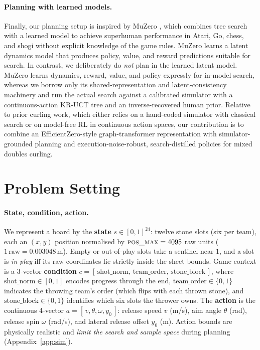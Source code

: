 \documentclass[11pt]{article}
\begin{document}
\paragraph{Planning with learned models.}
Finally, our planning setup is inspired by MuZero
\cite{schrittwieser2020mastering}, which combines tree search with a learned
model to achieve superhuman performance in Atari, Go, chess, and shogi
without explicit knowledge of the game rules. MuZero learns a latent
dynamics model that produces policy, value, and reward predictions suitable
for search. In contrast, we deliberately do \emph{not} plan in the learned
latent model. MuZero learns dynamics, reward, value, and policy expressly
for in-model search, whereas we borrow only its shared-representation and
latent-consistency machinery and run the actual search against a calibrated
simulator with a continuous-action KR-UCT tree \cite{yee2016monte} and an
inverse-recovered human prior. Relative to prior curling work, which either
relies on a hand-coded simulator with classical search or on model-free RL
in continuous action spaces, our contribution is to combine an
EfficientZero-style graph-transformer representation with simulator-grounded
planning and execution-noise-robust, search-distilled policies for mixed
doubles curling.

\section{Problem Setting}
\label{sec:problem}

\paragraph{State, condition, action.}
We represent a board by the \textbf{state} $s\in[0,1]^{24}$: twelve stone
slots (six per team), each an $(x,y)$ position normalised by
$\textsc{pos\_max}=4095$ raw units ($1\,\text{raw}=0.003048$\,m). Empty or
out-of-play slots take a sentinel near $1$, and a slot is \emph{in play} iff
its raw coordinates lie strictly inside the sheet bounds. Game context is a
3-vector \textbf{condition}
$c=[\,\text{shot\_norm},\,\text{team\_order},\,\text{stone\_block}\,]$, where
$\text{shot\_norm}\in[0,1]$ encodes progress through the end,
$\text{team\_order}\in\{0,1\}$ indicates the throwing team's order (which
flips with each thrown stone), and $\text{stone\_block}\in\{0,1\}$ identifies
which six slots the thrower owns. The \textbf{action} is the continuous
4-vector $a=[\,v,\theta,\omega,y_0\,]$: release speed $v$ (m/s), aim angle
$\theta$ (rad), release spin $\omega$ (rad/s), and lateral release offset
$y_0$ (m). Action bounds are physically realistic and \emph{limit the search
and sample space} during planning (Appendix~\ref{app:sim}).
\end{document}
